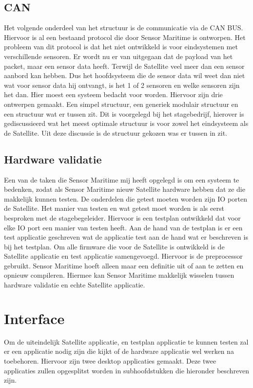 \subsection{CAN}
Het volgende onderdeel van het structuur is de communicatie via de CAN BUS. Hiervoor is al een bestaand protocol die door Sensor Maritime is ontworpen. Het probleem van dit protocol is dat het niet ontwikkeld is voor eindsystemen met verschillende sensoren. Er wordt nu er van uitgegaan dat de payload van het packet, maar een sensor data heeft. Terwijl de Satellite veel meer dan een sensor aanbord kan hebben. Dus het hoofdsysteem die de sensor data wil weet dan niet wat voor sensor data hij ontvangt, is het 1 of 2 sensoren en welke sensoren zijn het dan. Hier moest een systeem bedacht voor worden. Hiervoor zijn drie ontwerpen gemaakt. Een simpel structuur, een generiek modulair structuur en een structuur wat er tussen zit. Dit is voorgelegd bij het stagebedrijf, hierover is gediscussieerd wat het meest optimale structuur is voor zowel het eindsysteem als de Satellite. Uit deze discussie is de structuur gekozen was er tussen in zit.

\subsection{Hardware validatie}
Een van de taken die Sensor Maritime mij heeft opgelegd is om een systeem te bedenken, zodat als Sensor Maritime nieuw Satellite hardware hebben dat ze die makkelijk kunnen testen. De onderdelen die getest moeten worden zijn IO porten de Satellite. Het manier van testen en wat getest moet worden is als eerst besproken met de stagebegeleider. Hiervoor is een testplan ontwikkeld dat voor elke IO port een manier van testen heeft. Aan de hand van de testplan is er een test applicatie geschreven wat de applicatie test aan de hand wat er beschreven is bij het testplan. Om alle firmware die voor de Satellite is ontwikkeld is de Satellite applicatie en test applicatie samengevoegd. Hiervoor is de preprocessor gebruikt. Sensor Maritime hoeft alleen maar een definitie uit of aan te zetten en opnieuw compileren. Hiermee kan Sensor Maritime makkelijk wisselen tussen hardware validatie en echte Satellite applicatie.

\section{Interface}
Om de uiteindelijk Satellite applicatie, en testplan applicatie te kunnen testen zal er een applicatie nodig zijn die kijkt of de hardware applicatie wel werken na toebehoren. Hiervoor zijn twee desktop applicaties gemaakt. Deze twee applicaties zullen opgesplitst worden in subhoofdstukken die hieronder beschreven zijn.

